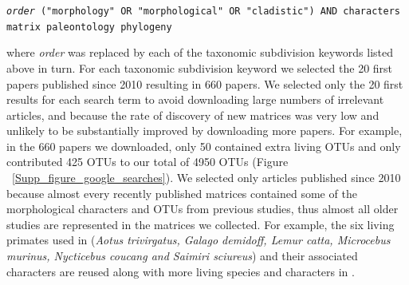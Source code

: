 \documentclass[12pt,letterpaper]{article}
\begin{document}
\texttt{\textit{order} ("morphology" OR "morphological" OR "cladistic") AND characters matrix paleontology phylogeny}

where \textit{order} was replaced by each of the taxonomic subdivision keywords listed above in turn.
For each taxonomic subdivision keyword we selected the 20 first papers published since 2010 resulting in 660 papers.
We selected only the 20 first results for each search term to avoid downloading large numbers of irrelevant articles, and because the rate of discovery of new matrices was very low and unlikely to be substantially improved by downloading more papers.
For example, in the 660 papers we downloaded, only 50 contained extra living OTUs and only contributed 425 OTUs to our total of 4950 OTUs (Figure ~\ref{Supp_figure_google_searches}).
We selected only articles published since 2010 because almost every recently published matrices contained some of the morphological characters and OTUs from previous studies, thus almost all older studies are represented in the matrices we collected.
For example, the six living primates used in \cite{ross1998phylogenetic} (\textit{Aotus trivirgatus, Galago demidoff, Lemur catta, Microcebus murinus, Nycticebus coucang and Saimiri sciureus}) and their associated characters are reused along with more living species and characters in \cite{seiffert2003fossil, marivaux2005anthropoid, seiffert2005basal, bloch2007new,bloch2007new, kay2008anatomy, silcox2008biogeographic, seiffert2009convergent,tabuce2009anthropoid, boyer2010astragalar, seiffert2010fossil, marivaux2013djebelemur, ni2013oldest}.
\end{document}
